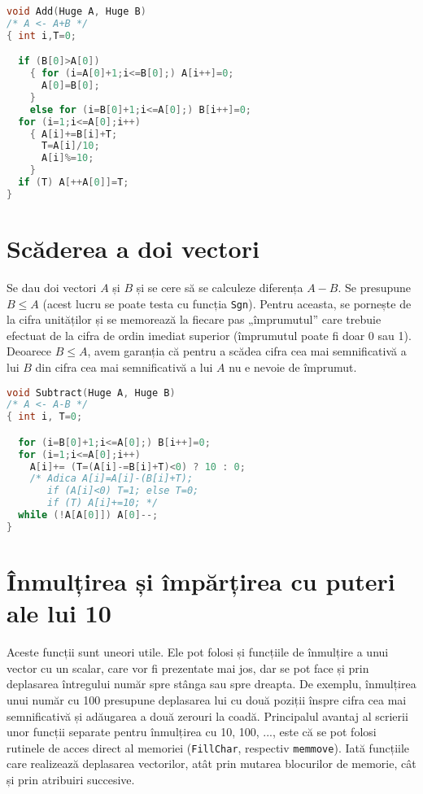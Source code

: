 \begin{lstlisting}[language=C]
void Add(Huge A, Huge B)
/* A <- A+B */
{ int i,T=0;

  if (B[0]>A[0])
    { for (i=A[0]+1;i<=B[0];) A[i++]=0;
      A[0]=B[0];
    }
    else for (i=B[0]+1;i<=A[0];) B[i++]=0;
  for (i=1;i<=A[0];i++)
    { A[i]+=B[i]+T;
      T=A[i]/10;
      A[i]%=10;
    }
  if (T) A[++A[0]]=T;
}
\end{lstlisting}

\section{Scăderea a doi vectori}

Se dau doi vectori $A$ și $B$ și se cere să se calculeze diferența $A - B$. Se
presupune $B \leq A$ (acest lucru se poate testa cu funcția {\tt Sgn}). Pentru
aceasta, se pornește de la cifra unităților și se memorează la fiecare pas
„împrumutul” care trebuie efectuat de la cifra de ordin imediat superior
(împrumutul poate fi doar 0 sau 1). Deoarece $B \leq A$, avem garanția că
pentru a scădea cifra cea mai semnificativă a lui $B$ din cifra cea mai
semnificativă a lui $A$ nu e nevoie de împrumut.

\begin{lstlisting}[language=C]
void Subtract(Huge A, Huge B)
/* A <- A-B */
{ int i, T=0;

  for (i=B[0]+1;i<=A[0];) B[i++]=0;
  for (i=1;i<=A[0];i++)
    A[i]+= (T=(A[i]-=B[i]+T)<0) ? 10 : 0;
    /* Adica A[i]=A[i]-(B[i]+T);
       if (A[i]<0) T=1; else T=0;
       if (T) A[i]+=10; */
  while (!A[A[0]]) A[0]--;
}
\end{lstlisting}

\section{Înmulțirea și împărțirea cu puteri ale lui 10}

Aceste funcții sunt uneori utile. Ele pot folosi și funcțiile de înmulțire a
unui vector cu un scalar, care vor fi prezentate mai jos, dar se pot face și
prin deplasarea întregului număr spre stânga sau spre dreapta. De exemplu,
înmulțirea unui număr cu 100 presupune deplasarea lui cu două poziții înspre
cifra cea mai semnificativă și adăugarea a două zerouri la coadă. Principalul
avantaj al scrierii unor funcții separate pentru înmulțirea cu 10, 100, ...,
este că se pot folosi rutinele de acces direct al memoriei ({\tt FillChar},
respectiv {\tt memmove}). Iată funcțiile care realizează deplasarea
vectorilor, atât prin mutarea blocurilor de memorie, cât și prin atribuiri
succesive.

